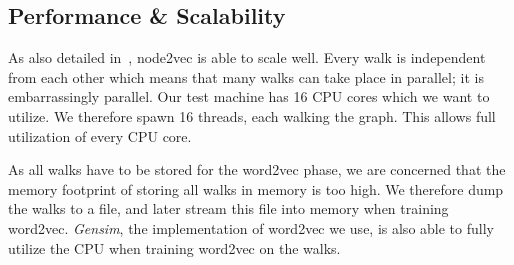 


%   


\subsection{Performance \& Scalability}
As also detailed in~\cite{node2vec}, node2vec is able to scale well. Every walk is independent from each other which means that many walks can take place in parallel; it is embarrassingly parallel. Our test machine has 16 CPU cores which we want to utilize. We therefore spawn 16 threads, each walking the graph. This allows full utilization of every CPU core.

As all walks have to be stored for the word2vec phase, we are concerned that the memory footprint of storing all walks in memory is too high. We therefore dump the walks to a file, and later stream this file into memory when training word2vec. \emph{Gensim}, the implementation of word2vec we use, is also able to fully utilize the CPU when training word2vec on the walks.

